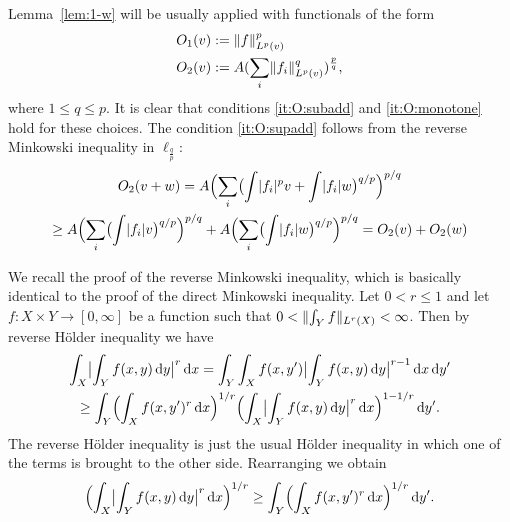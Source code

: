 \begin{remark}
\label{rem:1-w}
Lemma~\ref{lem:1-w} will be usually applied with functionals of the form
\begin{align}
O_1(v) &:= \norm{f}_{L^p(v)}^p \label{eq:O_1:practical}\\
O_2(v) &:= A (\sum_{i}\norm{f_i}_{L^p(v)}^{q})^{\frac{p}{q}}, \label{eq:O_2:practical}
\end{align}
where $1 \leq q \leq p$.
It is clear that conditions \eqref{it:O:subadd} and \eqref{it:O:monotone} hold for these choices.
The condition \eqref{it:O:supadd} follows from the reverse Minkowski inequality in $\ell_{\frac{q}{p}}$:
\begin{multline*}
O_2(v+w)
=
A \Bigl( \sum_{i} \bigl( \int \abs{f_{i}}^{p} v + \int \abs{f_{i}} w \bigr)^{q/p} \Bigr)^{p/q}\\
\geq
A \Bigl( \sum_{i} \bigl( \int \abs{f_{i}} v \bigr)^{q/p} \Bigr)^{p/q}
+
A \Bigl( \sum_{i} \bigl( \int \abs{f_{i}} w \bigr)^{q/p} \Bigr)^{p/q}
=
O_2(v) + O_2(w)
\end{multline*}
\end{remark}

\begin{remark}
We recall the proof of the reverse Minkowski inequality, which is basically identical to the proof of the direct Minkowski inequality.
Let $0<r\leq 1$ and let $f : X \times Y \to [0,\infty]$ be a function such that $0 < \norm{\int_{Y} f}_{L^{r}(X)} < \infty$.
Then by reverse H\"older inequality we have
\begin{multline*}
\int_{X} \abs[\big]{\int_{Y} f(x,y) \dif y}^{r} \dif x
=
\int_{Y} \int_{X} f(x,y') \abs[\big]{\int_{Y} f(x,y) \dif y}^{r-1} \dif x \dif y'\\
\geq
\int_{Y} \Bigl( \int_{X} f(x,y')^{r} \dif x \Bigr)^{1/r} \Bigl( \int_{X} \abs[\big]{\int_{Y} f(x,y) \dif y}^{r} \dif x \Bigr)^{1-1/r} \dif y'.
\end{multline*}
The reverse H\"older inequality is just the usual H\"older inequality in which one of the terms is brought to the other side.
Rearranging we obtain
\[
\Bigl( \int_{X} \abs[\big]{\int_{Y} f(x,y) \dif y}^{r} \dif x \Bigr)^{1/r}
\geq
\int_{Y} \Bigl( \int_{X} f(x,y')^{r} \dif x \Bigr)^{1/r} \dif y'.
\]
\end{remark}


